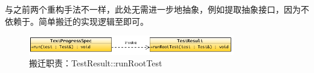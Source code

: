 \begin{content}
与之前两个重构手法不一样，此处无需进一步地抽象，例如提取抽象接口，因为不依赖于。简单搬迁的实现逻辑至即可。

\begin{figure}[H]
\centering
\includegraphics[width=0.8\textwidth]{figures/xunit/bare-test-uml.png}
\caption{搬迁职责：TestResult::runRootTest}
 \label{fig:bare-test-uml}
\end{figure}

\end{content}
